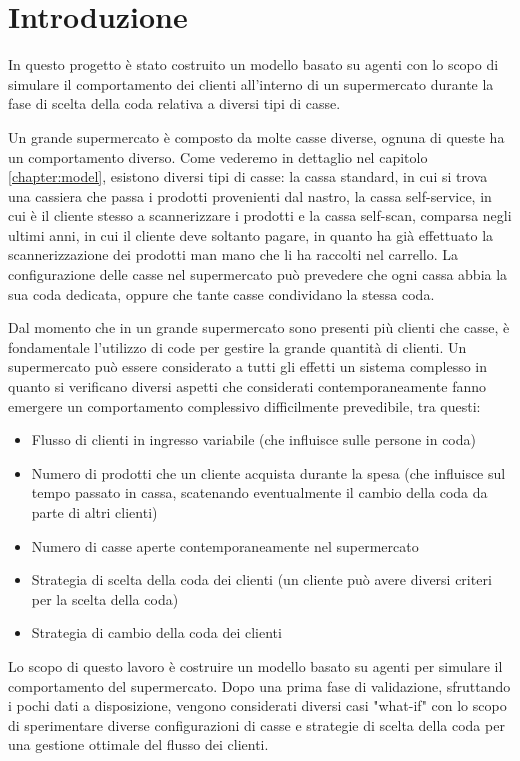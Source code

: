 \chapter{Introduzione}

In questo progetto è stato costruito un modello basato su agenti con lo scopo di simulare il comportamento dei clienti all'interno di un supermercato durante la fase di scelta della coda relativa a diversi tipi di casse.

Un grande supermercato è composto da molte casse diverse, ognuna di queste ha un comportamento diverso. Come vederemo in dettaglio nel capitolo \ref{chapter:model}, esistono diversi tipi di casse: la cassa standard, in cui si trova una cassiera che passa i prodotti provenienti dal nastro, la cassa self-service, in cui è il cliente stesso a scannerizzare i prodotti e la cassa self-scan, comparsa negli ultimi anni, in cui il cliente deve soltanto pagare, in quanto ha già effettuato la scannerizzazione dei prodotti man mano che li ha raccolti nel carrello. La configurazione delle casse nel supermercato può prevedere che ogni cassa abbia la sua coda dedicata, oppure che tante casse condividano la stessa coda.

Dal momento che in un grande supermercato sono presenti più clienti che casse, è fondamentale l'utilizzo di code per gestire la grande quantità di clienti.  Un supermercato può essere considerato a tutti gli effetti un sistema complesso in quanto si verificano diversi aspetti che considerati contemporaneamente fanno emergere un comportamento complessivo difficilmente prevedibile, tra questi:
\begin{itemize}
	\item Flusso di clienti in ingresso variabile (che influisce sulle persone in coda)
	\item Numero di prodotti che un cliente acquista durante la spesa (che influisce sul tempo passato in cassa, scatenando eventualmente il cambio della coda da parte di altri clienti)
	\item Numero di casse aperte contemporaneamente nel supermercato
	\item Strategia di scelta della coda dei clienti (un cliente può avere diversi criteri per la scelta della coda)
	\item Strategia di cambio della coda dei clienti
\end{itemize}


Lo scopo di questo lavoro è costruire un modello basato su agenti per simulare il comportamento del supermercato. Dopo una prima fase di validazione, sfruttando i pochi dati a disposizione, vengono considerati diversi casi "what-if" con lo scopo di sperimentare diverse configurazioni di casse e strategie di scelta della coda per una gestione ottimale del flusso dei clienti. 

